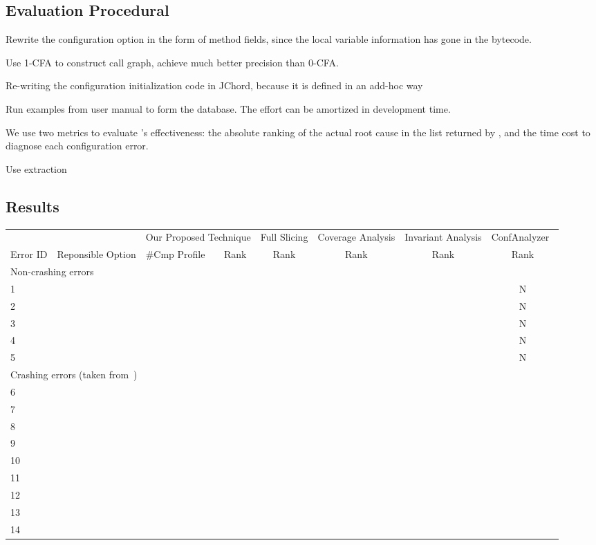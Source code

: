\subsection{Evaluation Procedural}


Rewrite the configuration option in the form of method fields, since
the local variable information has gone in the bytecode.

Use 1-CFA to construct call graph, achieve much better precision
than 0-CFA. 

Re-writing the configuration initialization code in JChord, because
it is defined in an add-hoc way

Run examples from user manual to form the database. The effort
can be amortized in development time.

We use two metrics to evaluate \ourtool's effectiveness: the absolute ranking of the
actual root cause in the list returned by \ourtool, and the
time cost to diagnose each configuration error.

Use extraction~\cite{Rabkin:2011:SEP}


\subsection{Results}

\begin{table*}[t]
\setlength{\tabcolsep}{.54\tabcolsep}
\begin{tabular}{|l||l||l|l||c||c||c||c|}
\hline
  & & \multicolumn{2}{|c||}{Our Proposed Technique} & Full Slicing & Coverage Analysis& Invariant Analysis & ConfAnalyzer~\cite{Rabkin:2011:PPC}\\
\cline{3-8}
 Error ID & Reponsible Option & \#Cmp Profile & Rank  & Rank & Rank & Rank & Rank \\
 \hline
\hline
\multicolumn{8}{|l|}{Non-crashing errors}   \\
 \hline
 1 & & & & & & &N \\
 2 & & & & & & &N\\
 3 & & & & & & &N\\
 4 & & & & & & &N\\
 5 & & & & & & &N\\
\hline
\hline
\multicolumn{8}{|l|}{Crashing errors (taken from~\cite{Rabkin:2011:PPC})}   \\
\hline
 6 & & & & & & &\\
 7 & & & & & & &\\
 8 & & & & & & &\\
 9 & & & & & & &\\
 10 & & & & & & &\\
 11 & & & & & & &\\
 12 & & & & & & &\\
 13 & & & & & & &\\
 14 & & & & & & &\\
\hline
\end{tabular}

\end{table*}


